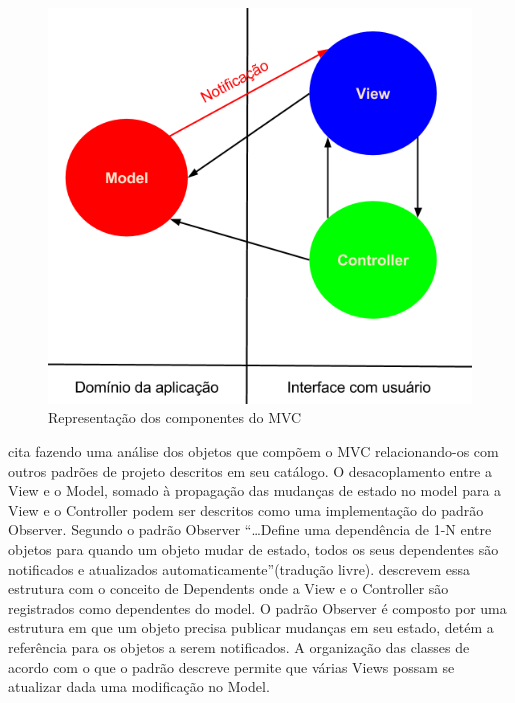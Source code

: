 \documentclass[conference]{IEEEtran}
\begin{document}
\begin{figure}[htb]
	\begin{center}
		\includegraphics[scale=0.45]{img/mvc.png}
	\end{center}
	
	\caption{\label{mvc}Representação dos componentes do MVC}
\end{figure}

\cite{gof} cita \cite{krasnerPope1988} fazendo uma análise dos
objetos que compõem o MVC relacionando-os com outros padrões de projeto
descritos em seu catálogo.
O desacoplamento entre a View e o Model, somado à propagação das mudanças de
estado no model para a View e o Controller podem ser
descritos como uma implementação do padrão Observer. Segundo \cite{gof} o padrão
Observer ``\ldots Define uma dependência de 1-N entre objetos para quando um
objeto mudar de estado, todos os seus dependentes são notificados e atualizados
automaticamente''(tradução livre). \cite{krasnerPope1988} descrevem essa
estrutura com o conceito de Dependents onde a View e o Controller são
registrados como dependentes do model. O padrão Observer é composto por uma
estrutura em que um objeto precisa publicar mudanças em seu estado, detém a
referência para os objetos a serem notificados. A organização das classes de
acordo com o que o padrão descreve permite que várias Views possam se atualizar
dada uma modificação no Model.
\end{document}
